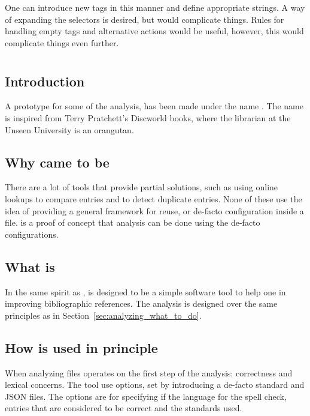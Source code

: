 One can introduce new tags in this manner and define appropriate
strings.  A way of expanding the selectors is desired, but would
complicate things.  Rules for handling empty tags and alternative
actions would be useful, however, this would complicate things even
further.


\section{{\orangutan}}
\label{sec:analyzing_orangutan}
\subsection{Introduction}

A prototype for some of the analysis, has been made under the name
\newdef{\orangutan}.  The name {\orangutan} is inspired from Terry
Pratchett's Discworld books, where the librarian at the Unseen
University is an orangutan.


\subsection{Why {\orangutan} came to be}

There are a lot of tools that provide partial solutions, such as using
online lookups to compare entries and to detect duplicate entries.
None of these use the idea of providing a general framework for reuse,
or de-facto configuration inside a {\bibtex} file.  {\orangutan} is a
proof of concept that analysis can be done using the de-facto
configurations.



\subsection{What is {\orangutan}}

In the same spirit as {\bibtex}, {\orangutan} is designed to be a
simple software tool to help one in improving bibliographic
references.  The analysis is designed over the same principles as in
Section~\ref{sec:analyzing_what_to_do}.


\subsection{How {\orangutan} is used in principle}

When analyzing {\bibtex} files {\orangutan} operates on the first step
of the analysis: correctness and lexical concerns.  The tool use
options, set by introducing a de-facto standard and JSON files.  The
options are for specifying if the language for the spell check,
entries that are considered to be correct and the standards used.


